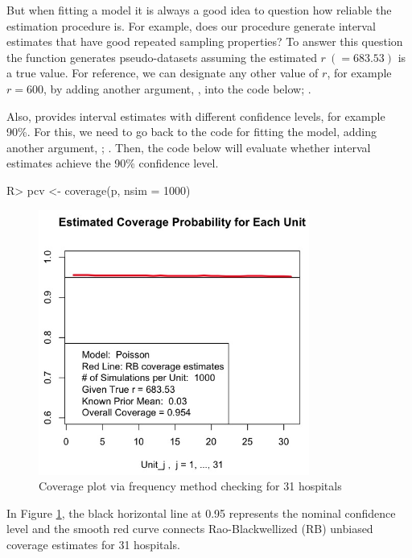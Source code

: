 \documentclass[article]{jss}
\begin{document}
But when fitting a model it is always a good idea to question how reliable the estimation procedure is. For example, does our procedure generate interval estimates that have good repeated sampling properties? To answer this question the  function generates pseudo-datasets assuming the estimated $r~(=683.53)$ is a true value. For reference, we can designate any other value of $r$, for example $r=600$, by adding another argument, , into the code below; .



Also,  provides interval estimates with different confidence levels, for example 90\%. For this, we need to go back to the code for fitting the model, adding another argument, ; .  Then, the code below will evaluate whether interval estimates achieve the 90\% confidence level.

\begin{CodeChunk}
\begin{CodeInput}
R> pcv <- coverage(p, nsim = 1000)
\end{CodeInput}
\end{CodeChunk}
\begin{figure}[h] 
\begin{center}
\includegraphics[width = 3.5in]{hospital2.png}
\caption{Coverage plot via frequency method checking for 31 hospitals}
\label{fig:hospitalcoverage}
\end{center}
\end{figure}

In Figure \ref{fig:hospitalcoverage}, the black horizontal line at 0.95 represents the nominal confidence level and the smooth red curve connects Rao-Blackwellized (RB) unbiased coverage estimates for 31 hospitals.
\end{document}
